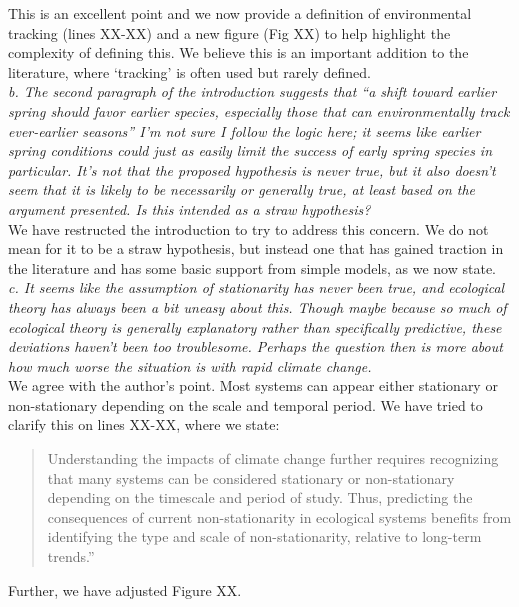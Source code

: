 \documentclass[11pt]{article}
\begin{document}
This is an excellent point and we now provide a definition of environmental tracking (lines XX-XX) and a new figure (Fig XX) to help highlight the complexity of defining this. We believe this is an important addition to the literature, where `tracking' is often used but rarely defined. \\
 
\emph{b.      The second paragraph of the introduction suggests that ``a shift toward earlier spring
should favor earlier species, especially those that can environmentally track ever-earlier
seasons'' I’m not sure I follow the logic here; it seems like earlier spring conditions could
just as easily limit the success of early spring species in particular. It’s not that the
proposed hypothesis is never true, but it also doesn’t seem that it is likely to be
necessarily or generally true, at least based on the argument presented. Is this intended as
a straw hypothesis?}\\

We have restructed the introduction to try to address this concern. We do not mean for it to be a straw hypothesis, but instead one that has gained traction in the literature and has some basic support from simple models, as we now state.\\

\emph{c.      It seems like the assumption of stationarity has never been true, and ecological
theory has always been a bit uneasy about this. Though maybe because so much of ecological
theory is generally explanatory rather than specifically predictive, these deviations haven’t
been too troublesome. Perhaps the question then is more about how much worse the situation is
with rapid climate change.}\\

We agree with the author's point. Most systems can appear either stationary or non-stationary depending on the scale and temporal period. We have tried to clarify this on lines XX-XX, where we state:
\begin{quote}
Understanding the impacts of climate change further requires recognizing that many systems can be considered stationary or non-stationary depending on the timescale and period of study. Thus, predicting the consequences of current non-stationarity in ecological systems benefits from identifying the type and scale of non-stationarity, relative to long-term trends.'' 
\end{quote}
Further, we have adjusted Figure XX. \\
\end{document}
